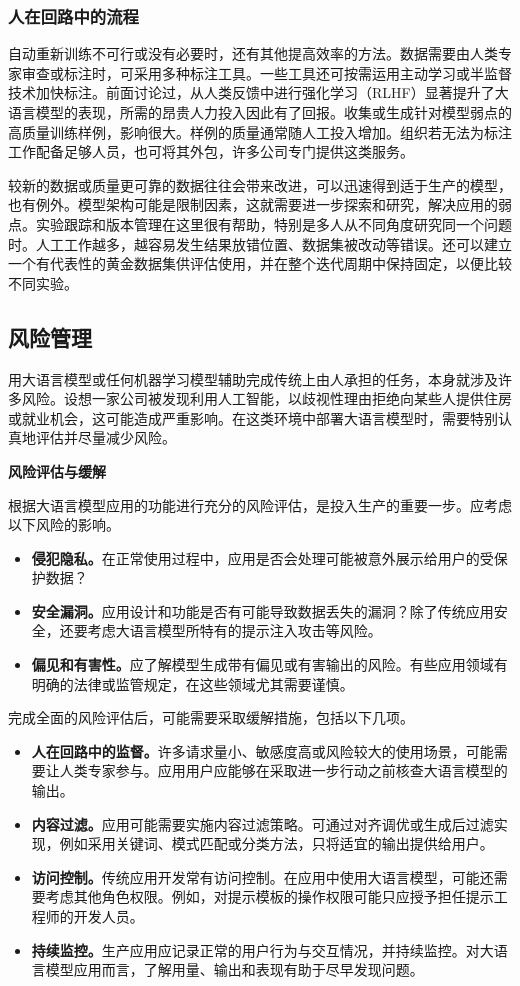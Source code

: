 \subsubsection{人在回路中的流程}
自动重新训练不可行或没有必要时，还有其他提高效率的方法。数据需要由人类专家审查或标注时，可采用多种标注工具。一些工具还可按需运用主动学习或半监督技术加快标注。前面讨论过，从人类反馈中进行强化学习（RLHF）显著提升了大语言模型的表现，所需的昂贵人力投入因此有了回报。收集或生成针对模型弱点的高质量训练样例，影响很大。样例的质量通常随人工投入增加。组织若无法为标注工作配备足够人员，也可将其外包，许多公司专门提供这类服务。

较新的数据或质量更可靠的数据往往会带来改进，可以迅速得到适于生产的模型，也有例外。模型架构可能是限制因素，这就需要进一步探索和研究，解决应用的弱点。实验跟踪和版本管理在这里很有帮助，特别是多人从不同角度研究同一个问题时。人工工作越多，越容易发生结果放错位置、数据集被改动等错误。还可以建立一个有代表性的黄金数据集供评估使用，并在整个迭代周期中保持固定，以便比较不同实验。

\subsection{风险管理}
用大语言模型或任何机器学习模型辅助完成传统上由人承担的任务，本身就涉及许多风险。设想一家公司被发现利用人工智能，以歧视性理由拒绝向某些人提供住房或就业机会，这可能造成严重影响。在这类环境中部署大语言模型时，需要特别认真地评估并尽量减少风险。

\begin{keypoint}
\textbf{风险评估与缓解}

根据大语言模型应用的功能进行充分的风险评估，是投入生产的重要一步。应考虑以下风险的影响。
\begin{itemize}
\item \textbf{侵犯隐私。}在正常使用过程中，应用是否会处理可能被意外展示给用户的受保护数据？
\item \textbf{安全漏洞。}应用设计和功能是否有可能导致数据丢失的漏洞？除了传统应用安全，还要考虑大语言模型所特有的提示注入攻击等风险。
\item \textbf{偏见和有害性。}应了解模型生成带有偏见或有害输出的风险。有些应用领域有明确的法律或监管规定，在这些领域尤其需要谨慎。
\end{itemize}
完成全面的风险评估后，可能需要采取缓解措施，包括以下几项。
\begin{itemize}
\item \textbf{人在回路中的监督。}许多请求量小、敏感度高或风险较大的使用场景，可能需要让人类专家参与。应用用户应能够在采取进一步行动之前核查大语言模型的输出。
\item \textbf{内容过滤。}应用可能需要实施内容过滤策略。可通过对齐调优或生成后过滤实现，例如采用关键词、模式匹配或分类方法，只将适宜的输出提供给用户。
\item \textbf{访问控制。}传统应用开发常有访问控制。在应用中使用大语言模型，可能还需要考虑其他角色权限。例如，对提示模板的操作权限可能只应授予担任提示工程师的开发人员。
\item \textbf{持续监控。}生产应用应记录正常的用户行为与交互情况，并持续监控。对大语言模型应用而言，了解用量、输出和表现有助于尽早发现问题。
\end{itemize}
\end{keypoint}

